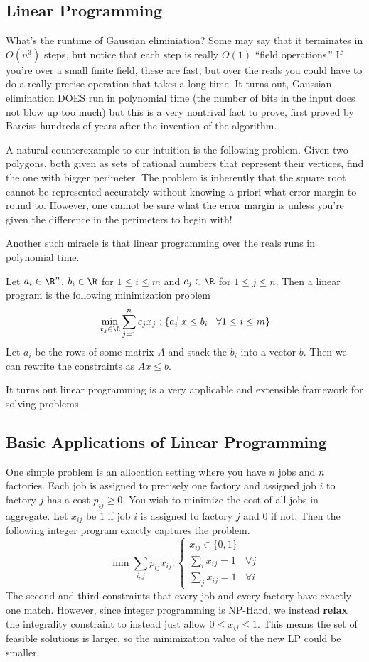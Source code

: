 \subsection{Linear Programming}
What's the runtime of Gaussian eliminiation?
Some may say that it terminates in $O(n^3)$ steps,
but notice that each step is really $O(1)$ ``field operations.''
If you're over a small finite field, these are fast, but over the reals
you could have to do a really precise operation that takes a long time.
It turns out, Gaussian elimination DOES run in polynomial time
(the number of bits in the input does not blow up too much)
but this is a very nontrival fact to prove, first proved by Bareiss hundreds
of years after the invention of the algorithm.

A natural counterexample to our intuition is the following problem.
Given two polygons, both given as sets of rational numbers that represent their vertices,
find the one with bigger perimeter. The problem is inherently that the square root cannot
be represented accurately without knowing a priori what error margin to round to.
However, one cannot be sure what the error margin is unless you're given the difference in the perimeters to begin with!

Another such miracle is that linear programming over the reals runs in polynomial time.
\begin{definition}
    Let $a_i \in \R^n$, $b_i \in \R$ for $1 \le i \le m$ and $c_j \in \R$ for $1 \le j \le n$.
    Then a linear program is the following minimization problem
    \[ \min_{x_j \in \R} \sum_{j = 1}^{n} c_j x_j : \{ a_i^{\top} x \le b_i \,\,\,\,\, \forall 1 \le i \le m \} \]
    Let $a_i$ be the rows of some matrix $A$ and stack the $b_i$ into a vector $b$.
    Then we can rewrite the constraints as $Ax \le b$.
\end{definition}
It turns out linear programming is a very applicable and extensible framework for solving problems.

\subsection{Basic Applications of Linear Programming}
One simple problem is an allocation setting where you have $n$ jobs and $n$ factories.
Each job is assigned to precisely one factory and assigned job $i$ to factory $j$
has a cost $p_{ij} \ge 0$. You wish to minimize the cost of all jobs in aggregate.
Let $x_{ij}$ be $1$ if job $i$ is assigned to factory $j$ and $0$ if not.
Then the following integer program exactly captures the problem.
\[ \min \sum_{i, j} p_{ij} x_{ij} : \begin{cases} x_{ij} \in \{0, 1\}\\ \sum_{i} x_{ij} = 1 & \forall j \\ \sum_{j} x_{ij} = 1 & \forall i \end{cases} \]
The second and third constraints that every job and every factory have exactly one match.
However, since integer programming is NP-Hard, we instead
\textbf{relax} the integrality constraint to instead just allow $0 \le x_{ij} \le 1$.
This means the set of feasible solutions is larger, so the minimization value of the new LP could be smaller.

